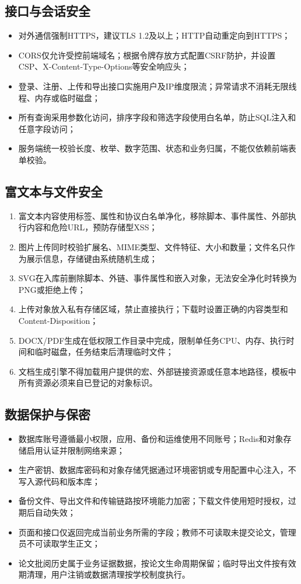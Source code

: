 \documentclass{../template/softeng}
\begin{document}
	\subsection{接口与会话安全}
	\begin{itemize}
		\item 对外通信强制HTTPS，建议TLS 1.2及以上；HTTP自动重定向到HTTPS；
		\item CORS仅允许受控前端域名；根据令牌存放方式配置CSRF防护，并设置CSP、X-Content-Type-Options等安全响应头；
		\item 登录、注册、上传和导出接口实施用户及IP维度限流；异常请求不消耗无限线程、内存或临时磁盘；
		\item 所有查询采用参数化访问，排序字段和筛选字段使用白名单，防止SQL注入和任意字段访问；
		\item 服务端统一校验长度、枚举、数字范围、状态和业务归属，不能仅依赖前端表单校验。
	\end{itemize}
	
	\subsection{富文本与文件安全}
	\begin{enumerate}
		\item 富文本内容使用标签、属性和协议白名单净化，移除脚本、事件属性、外部执行内容和危险URL，预防存储型XSS；
		\item 图片上传同时校验扩展名、MIME类型、文件特征、大小和数量；文件名只作为展示信息，存储键由系统随机生成；
		\item SVG在入库前删除脚本、外链、事件属性和嵌入对象，无法安全净化时转换为PNG或拒绝上传；
		\item 上传对象放入私有存储区域，禁止直接执行；下载时设置正确的内容类型和Content-Disposition；
		\item DOCX/PDF生成在低权限工作目录中完成，限制单任务CPU、内存、执行时间和临时磁盘，任务结束后清理临时文件；
		\item 文档生成引擎不得加载用户提供的宏、外部链接资源或任意本地路径，模板中所有资源必须来自已登记的对象标识。
	\end{enumerate}
	
	\subsection{数据保护与保密}
	\begin{itemize}
		\item 数据库账号遵循最小权限，应用、备份和运维使用不同账号；Redis和对象存储启用认证并限制网络来源；
		\item 生产密钥、数据库密码和对象存储凭据通过环境密钥或专用配置中心注入，不写入源代码和版本库；
		\item 备份文件、导出文件和传输链路按环境能力加密；下载文件使用短时授权，过期后自动失效；
		\item 页面和接口仅返回完成当前业务所需的字段；教师不可读取未提交论文，管理员不可读取学生正文；
		\item 论文批阅历史属于业务证据数据，按论文生命周期保留；临时导出文件按有效期清理，用户注销或数据清理按学校制度执行。
	\end{itemize}
	
\end{document}
